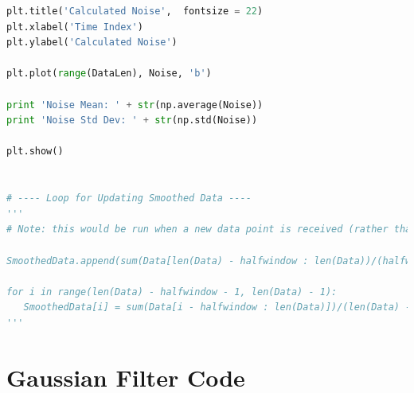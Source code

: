\documentclass[11pt]{article}
\theoremstyle{definition}
\begin{document}
\begin{lstlisting}[language = Python]
plt.title('Calculated Noise',  fontsize = 22)
plt.xlabel('Time Index')
plt.ylabel('Calculated Noise')

plt.plot(range(DataLen), Noise, 'b')

print 'Noise Mean: ' + str(np.average(Noise))
print 'Noise Std Dev: ' + str(np.std(Noise))

plt.show()


# ---- Loop for Updating Smoothed Data ----
'''
# Note: this would be run when a new data point is received (rather than re-running the whole function for all data)

SmoothedData.append(sum(Data[len(Data) - halfwindow : len(Data))/(halfwindow + 1)))

for i in range(len(Data) - halfwindow - 1, len(Data) - 1):
   SmoothedData[i] = sum(Data[i - halfwindow : len(Data)])/(len(Data) - 1 - i + halfwindow)
'''

\end{lstlisting}

\pagebreak


\section{Gaussian Filter Code}
\end{document}
